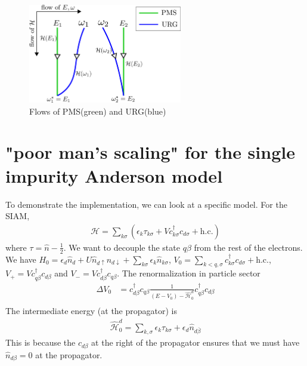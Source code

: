 \documentclass[twoside,11pt]{report}
\numberwithin{equation}{section}
\begin{document}
\begin{figure}
\centering
\includegraphics[width=0.6\textwidth]{pms_vs_urg.png}
\caption{Flows of PMS(green) and URG(blue)}
\end{figure}
\section{"poor man's scaling" for the single impurity Anderson model}
To demonstrate the implementation, we can look at a specific model. For the SIAM,
\begin{equation}\begin{aligned}
	\mathcal{H} = \sum_{k\sigma}\left(\epsilon_k \tau_{k\sigma} + V c^\dagger_{k\sigma}c_{d\sigma} + \text{h.c.}\right)
\end{aligned}\end{equation}
where \(\tau = \hat n - \frac{1}{2}\). We want to decouple the state \(q\beta\) from the rest of the electrons. We have \({H}_0 = \epsilon_d\hat n_d + U \hat n_{d\uparrow}n_{d\downarrow} + \sum_{k\sigma} \epsilon_k \hat n_{k\sigma}\), \(V_0 = \sum_{k<q,\sigma}c^\dagger_{k\sigma}c_{d\sigma}+\text{h.c.}\), \(V_+ = V c^\dagger_{q\beta}c_{d\beta}\) and \(V_- = V c^\dagger_{d\beta}c_{q\beta}\). The renormalization in particle sector
\begin{equation}\begin{aligned}
	\Delta V_0 &=  c^\dagger_{d\beta}c_{q\beta}\frac{1}{\left(E - V_0\right) - \hat{\mathcal{H}}^d_0}c^\dagger_{q\beta}c_{d\beta}\\
\end{aligned}\end{equation}
The intermediate energy (at the propagator) is
\begin{equation}\begin{aligned}
	\hat{\mathcal{H}}^d_0 = \sum_{k,\sigma}\epsilon_k \tau_{k\sigma} + \epsilon_d \hat n_{d\overline\beta}
\end{aligned}\end{equation}
This is because the \(c_{d\beta}\) at the right of the propagator ensures that we must have \(\hat n_{d\beta}=0\) at the propagator.
\end{document}
